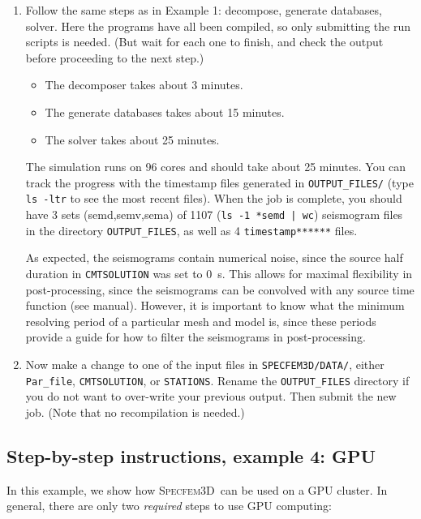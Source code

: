 \documentclass[10pt,fleqn,letterpaper]{article}
\newcommand{\specfem}{\textsc{Specfem3D}}
\begin{document}
\begin{enumerate}
\item Follow the same steps as in Example 1: decompose, generate databases, solver. Here the programs have all been compiled, so only submitting the run scripts is needed. (But wait for each one to finish, and check the output before proceeding to the next step.)
%
\begin{itemize}
\item The decomposer takes about 3 minutes.
\item The generate databases takes about 15 minutes.
\item The solver takes about 25 minutes.
\end{itemize}
%
The simulation runs on 96 cores and should take about 25 minutes. You can track the progress with the timestamp files generated in \verb+OUTPUT_FILES/+ (type \verb+ls -ltr+ to see the most recent files). When the job is complete, you should have 3 sets (semd,semv,sema) of 1107 (\verb+ls -1 *semd | wc+) seismogram files in the directory \verb+OUTPUT_FILES+, as well as 4 \verb+timestamp******+ files.

As expected, the seismograms contain numerical noise, since the source half duration in \verb+CMTSOLUTION+ was set to 0~s. This allows for maximal flexibility in post-processing, since the seismograms can be convolved with any source time function (see manual). However, it is important to know what the minimum resolving period of a particular mesh and model is, since these periods provide a guide for how to filter the seismograms in post-processing.

\item Now make a change to one of the input files in \verb+SPECFEM3D/DATA/+, either \verb+Par_file+, \verb+CMTSOLUTION+, or \verb+STATIONS+. Rename the \verb+OUTPUT_FILES+ directory if you do not want to over-write your previous output. Then submit the new job. (Note that no recompilation is needed.)

\end{enumerate}


\subsection*{Step-by-step instructions, example 4: GPU}

In this example, we show how \specfem\ can be used on a GPU cluster. In general,
there are only two {\em required} steps to use GPU computing:
\end{document}
